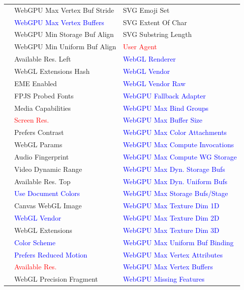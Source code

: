 {\begin{longtable}{l | l | l}
 & WebGPU Max Vertex Buf Stride & SVG Emoji Set \\
 & \textcolor{blue}{WebGPU Max Vertex Buffers} & SVG Extent Of Char \\
 & WebGPU Min Storage Buf Align & SVG Substring Length \\
 & WebGPU Min Uniform Buf Align & \textcolor{red}{User Agent} \\
 & Available Res. Left & \textcolor{blue}{WebGL Renderer} \\
 & WebGL Extensions Hash & \textcolor{blue}{WebGL Vendor} \\
 & EME Enabled & \textcolor{blue}{WebGL Vendor Raw} \\
 & FPJS Probed Fonts & \textcolor{blue}{WebGPU Fallback Adapter} \\
 & Media Capabilities & \textcolor{blue}{WebGPU Max Bind Groups} \\
 & \textcolor{red}{Screen Res.} & \textcolor{blue}{WebGPU Max Buffer Size} \\
 & Prefers Contrast & \textcolor{blue}{WebGPU Max Color Attachments} \\
 & WebGL Params & \textcolor{blue}{WebGPU Max Compute Invocations} \\
 & Audio Fingerprint & \textcolor{blue}{WebGPU Max Compute WG Storage} \\
 & Video Dynamic Range & \textcolor{blue}{WebGPU Max Dyn. Storage Bufs} \\
 & Available Res. Top & \textcolor{blue}{WebGPU Max Dyn. Uniform Bufs} \\
 & \textcolor{blue}{Use Document Colors} & \textcolor{blue}{WebGPU Max Storage Bufs/Stage} \\
 & Canvas WebGL Image & \textcolor{blue}{WebGPU Max Texture Dim 1D} \\
 & \textcolor{blue}{WebGL Vendor} & \textcolor{blue}{WebGPU Max Texture Dim 2D} \\
 & WebGL Extensions & \textcolor{blue}{WebGPU Max Texture Dim 3D} \\
 & \textcolor{blue}{Color Scheme} & \textcolor{blue}{WebGPU Max Uniform Buf Binding} \\
 & \textcolor{blue}{Prefers Reduced Motion} & \textcolor{blue}{WebGPU Max Vertex Attributes} \\
 & \textcolor{red}{Available Res.} & \textcolor{blue}{WebGPU Max Vertex Buffers} \\
 & WebGL Precision Fragment & \textcolor{blue}{WebGPU Missing Features} \\
\end{longtable}
}
